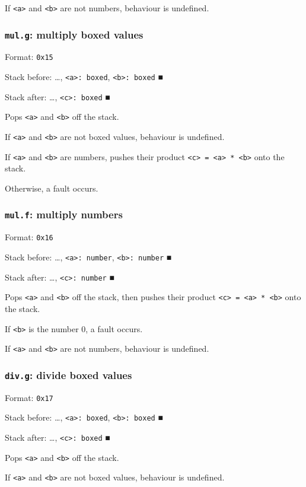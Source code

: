 If \texttt{<a>} and \texttt{<b>} are not numbers, behaviour is undefined.

\subsubsection{\texttt{mul.g}: multiply boxed values}
\label{sec:org742c65a}
Format: \texttt{0x15}

Stack before: \ldots{}​, \texttt{<a>: boxed}, \texttt{<b>: boxed} ■

Stack after: \ldots{}​, \texttt{<c>: boxed} ■

Pops \texttt{<a>} and \texttt{<b>} off the stack.

If \texttt{<a>} and \texttt{<b>} are not boxed values, behaviour is undefined.

If \texttt{<a>} and \texttt{<b>} are numbers, pushes their product \texttt{<c> = <a> * <b>}
onto the stack.

Otherwise, a fault occurs.

\subsubsection{\texttt{mul.f}: multiply numbers}
\label{sec:org29a8cb0}
Format: \texttt{0x16}

Stack before: \ldots{}​, \texttt{<a>: number}, \texttt{<b>: number} ■

Stack after: \ldots{}​, \texttt{<c>: number} ■

Pops \texttt{<a>} and \texttt{<b>} off the stack, then pushes their product
\texttt{<c> = <a> * <b>} onto the stack.

If \texttt{<b>} is the number 0, a fault occurs.

If \texttt{<a>} and \texttt{<b>} are not numbers, behaviour is undefined.

\subsubsection{\texttt{div.g}: divide boxed values}
\label{sec:org97eb268}
Format: \texttt{0x17}

Stack before: \ldots{}​, \texttt{<a>: boxed}, \texttt{<b>: boxed} ■

Stack after: \ldots{}​, \texttt{<c>: boxed} ■

Pops \texttt{<a>} and \texttt{<b>} off the stack.

If \texttt{<a>} and \texttt{<b>} are not boxed values, behaviour is undefined.

